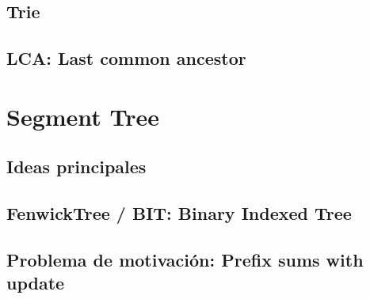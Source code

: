 \documentclass[12pt, fleqn]{report}                             %
\theoremstyle{break}                                            %
\begin{document}
        \section{Trie}

        \section{LCA: Last common ancestor}

    
    \clearpage
    \chapter{Segment Tree}

        \section{Ideas principales}

            
                

    \clearpage
    \section{FenwickTree / BIT: Binary Indexed Tree}

        \section{Problema de motivación: Prefix sums with update}
\end{document}

